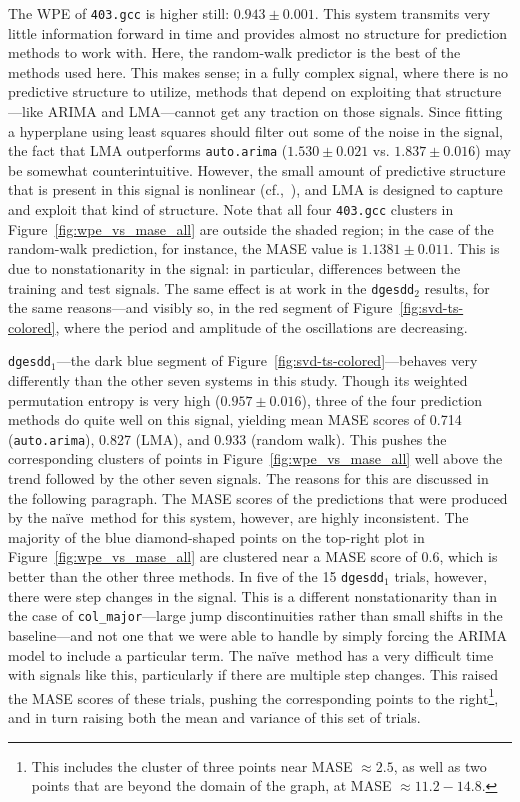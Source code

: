 \documentclass[%
pre,
reprint,
superscriptaddress,
showpacs,
nofootinbib,
nobibnotes,
 amsmath,amssymb,
 aps,
]{revtex4-1}
\newcommand{\gcc}{{\tt 403.gcc}\xspace}
\newcommand{\svdone}{{\tt dgesdd}$_1$\xspace}
\newcommand{\svdtwo}{{\tt dgesdd$_2$}\xspace}
\newcommand{\arima}{{\tt auto.arima}\xspace}
\newcommand{\naive}{na\"ive}
\newcommand{\col}{{\tt col\_major}\xspace}
\begin{document}
The WPE of \gcc is higher still: $0.943 \pm 0.001$.  This system
transmits very little information forward in time and provides almost
no structure for prediction methods to work with.  Here, the
random-walk predictor is the best of the methods used here.  This
makes sense; in a fully complex signal, where there is no predictive
structure to utilize, methods that depend on exploiting that
structure---like ARIMA and LMA---cannot get any traction on those
signals.
%
%
Since fitting a hyperplane using least squares should filter out some
of the noise in the signal, the fact that LMA outperforms \arima
($1.530 \pm 0.021$ vs. $1.837 \pm 0.016$) may be somewhat
counterintuitive.  However, the small amount of predictive structure
that is present in this signal is nonlinear (cf.,~\cite{mytkowicz09}),
and LMA is designed to capture and exploit that kind of structure.
Note that all four \gcc clusters in Figure~\ref{fig:wpe_vs_mase_all}
are outside the shaded region; in the case of the random-walk
prediction, for instance, the MASE value is $1.1381 \pm 0.011$.  This
is due to nonstationarity in the signal: in particular, differences
between the training and test signals.  The same effect is at work in
the \svdtwo results, for the same reasons---and visibly so, in the red
segment of Figure~\ref{fig:svd-ts-colored}, where the period and
amplitude of the oscillations are decreasing.

\svdone---the dark blue segment of
Figure~\ref{fig:svd-ts-colored}---behaves very differently than the
other seven systems in this study.  Though its weighted permutation
entropy is very high ($0.957 \pm 0.016$), three of the four prediction
methods do quite well on this signal, yielding mean MASE scores of
0.714 (\arima), 0.827 (LMA), and 0.933 (random walk).  This pushes the
corresponding clusters of points in Figure~\ref{fig:wpe_vs_mase_all}
well above the trend followed by the other seven signals.  The reasons
for this are discussed in the following paragraph.  The MASE scores of
the predictions that were produced by the \naive ~method for this
system, however, are highly inconsistent.  The majority of the blue
diamond-shaped points on the top-right plot in
Figure~\ref{fig:wpe_vs_mase_all} are clustered near a MASE score of
0.6, which is better than the other three methods.  In five of the 15
\svdone trials, however, there were step changes in the signal.  This
is a different nonstationarity than in the case of \col---large jump
discontinuities rather than small shifts in the baseline---and not one
that we were able to handle by simply forcing the ARIMA model to
include a particular term.  The \naive ~method has a very difficult
time with signals like this, particularly if there are multiple step
changes.  This raised the MASE scores of these trials, pushing the
corresponding points to the right\footnote{This includes the cluster
  of three points near MASE $\approx 2.5$, as well as two points that
  are beyond the domain of the graph, at MASE $\approx 11.2-14.8$.},
and in turn raising both the mean and variance of this set of trials.
\end{document}
